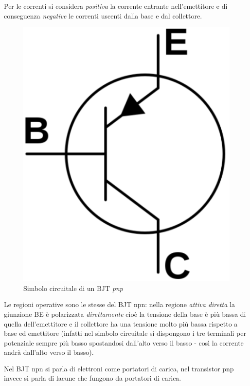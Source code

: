 \documentclass[12pt, a4paper]{report}
\begin{document}
Per le correnti si considera \textit{positiva} la corrente entrante nell'emettitore e di conseguenza \textit{negative} le correnti uscenti dalla base e dal collettore.
\begin{figure}[h]
    \centering
    \includegraphics[scale=0.4,angle=0]{bjt_pnp_simbolo.png}
    \caption{Simbolo circuitale di un BJT \textit{pnp}}
\end{figure}

Le regioni operative sono le stesse del BJT npn: nella regione \textit{attiva diretta} la giunzione BE è polarizzata \textit{direttamente} cioè la tensione della base è più bassa di quella dell'emettitore e il collettore ha una tensione molto più bassa rispetto a base ed emettitore (infatti nel simbolo circuitale si dispongono i tre terminali per potenziale sempre più basso spostandosi dall'alto verso il basso - così la corrente andrà dall'alto verso il basso).

Nel BJT npn si parla di elettroni come portatori di carica, nel transistor pnp invece si parla di lacune che fungono da portatori di carica.
\end{document}
